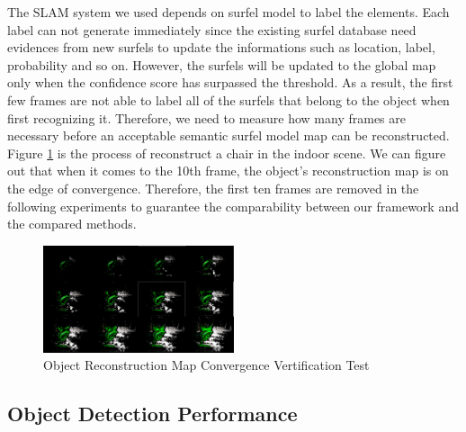 \documentclass[conference]{IEEEtran}
\begin{document}
The SLAM system we used depends on surfel model to label the elements. Each label {\color{blue}can not} generate immediately since the existing surfel database need  evidences from new surfels to update the informations such as location, label, probability and so on. However, the surfels will be updated to the global map only when the confidence score has surpassed the threshold. As a result, the first few frames are not able to label all of the surfels that belong to the object when first recognizing it. Therefore, we need to measure how many frames are necessary before an acceptable semantic surfel model map can be reconstructed. Figure \ref{fig:fig_convergence} is the process of reconstruct a chair in the indoor scene. We can figure out that when it comes to the 10th frame, the object's reconstruction map is on the edge of convergence. Therefore, the first ten frames are removed in the following experiments to guarantee the comparability between our framework and the compared methods.

\begin{figure}[htbp]
	\centering
	\includegraphics[width=0.5\textwidth]{pic/fig10.png}
	\centering
	\caption{Object Reconstruction Map Convergence Vertification Test}
	\label{fig:fig_convergence}
\end{figure} 



\subsection{\textbf{Object Detection Performance}}
\end{document}

